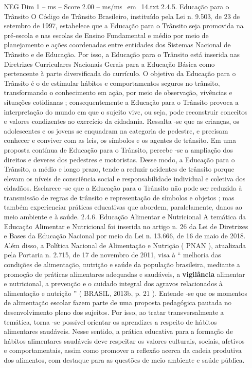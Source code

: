 \begin{textsample}{NEG Dim 1 – ms – Score 2.00 – ms/ms\_em\_14.txt}  \label{ex:f1_neg_101}
2.4.5.
Educação para o Trânsito O Código de Trânsito Brasileiro, instituído pela Lei n. 9.503, de 23 de setembro de 1997, estabelece que a Educação para o Trânsito seja promovida na pré-escola e nas escolas de Ensino Fundamental e médio por meio de planejamento e ações coordenadas entre entidades dos Sistemas Nacional de Trânsito e de Educação.
Por isso, a Educação para o Trânsito está inserida nas Diretrizes Curriculares Nacionais Gerais para a Educação Básica como pertencente à parte diversificada do currículo.
O objetivo da Educação para o Trânsito é o de estimular hábitos e comportamentos seguros no trânsito, transformando o conhecimento em ação, por meio de observação, vivências e situações cotidianas ; consequentemente a Educação para o Trânsito provoca a interpretação do mundo em que o sujeito vive, ou seja, pode reconstruir conceitos e valores condizentes ao exercício da cidadania.
Ressalta -se que as crianças, os adolescentes e os jovens se enquadram na categoria de pedestre, e precisam conhecer e conviver com as leis, os símbolos e os agentes de trânsito.
Em uma proposta contínua de Educação para o Trânsito, percebe -se a ampliação dos direitos e deveres dos pedestres e motoristas.
Desse modo, a Educação para o Trânsito, a médio e longo prazo, tende a reduzir acidentes de trânsito porque elevam os níveis de consciência social e responsabilidade individual e coletiva dos cidadãos.
Esclarece -se que a Educação para o Trânsito não pode ser reduzida à transmissão de regras de trânsito e representação de símbolos e objetos ; mas também experienciar práticas educativas que abordem, paralelamente, danos ao meio ambiente e à saúde. 2.4.6.
Educação Alimentar e Nutricional A temática da Educação Alimentar e Nutricional foi inserida no artigo n. 26 da Lei de Diretrizes e Bases da Educação Nacional por meio da Lei n. 13.666, de 16 de maio de 2018.
Além disso, a Política Nacional de Alimentação e Nutrição ( PNAN ), atualizada pela Portaria n. 2.715, de 17 de novembro de 2011, visa à “ melhoria das condições de alimentação, nutrição e saúde da população brasileira, mediante a promoção de práticas alimentares adequadas e saudáveis, a \textbf{vigilância} alimentar e nutricional, a prevenção e o cuidado integral dos agravos relacionados à alimentação e nutrição ” ( BRASIL, 2013b, p. 21 ).
Entende -se que os momentos de alimentação escolar fazem parte de uma proposta pedagógica pautada no desenvolvimento pleno dos sujeitos.
Por isso, ao tratar transversalmente a temática, torna -se possível orientar os aprendizes a respeito de hábitos alimentares saudáveis.
Nesse sentido, a prática educativa para a formação de hábitos alimentares saudáveis deve respeitar os valores culturais, sociais, afetivos e comportamentais, assim como promover a reflexão acerca da cadeia produtiva dos alimentos, com destaque para as questões de meio ambiente e saúde pública.

\end{textsample}
